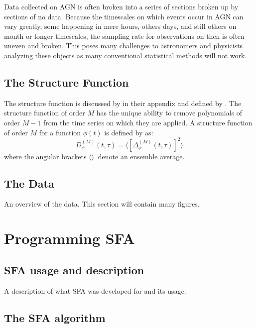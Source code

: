 \documentclass[12pt, oneside]{smuthesis}
\begin{document}
Data collected on AGN is often broken into a series of sections broken up by sections of no data. Because the timescales on which events occur in AGN can vary greatly, some happening in mere hours, others days, and still others on month or longer timescales, the sampling rate for observations on then is often uneven and broken. This poses many challenges to astronomers and physicists analyzing these objects as many conventional statistical methods will not work.

\section{\sc The Structure Function} \label{structureFunction}

The structure function is discussed by \citep{cordes1985} in their appendix and defined by \citep{rutman}. The structure function of order $M$ has the unique ability to remove polynomials of order $M-1$ from the time series on which they are applied. A structure function of order $M$ for a function $\phi\left(t\right)$ is defined by \cite{rutman} as:
\begin{equation}
D^{\left(M\right)}_{\phi}\left(t, \tau\right) = \langle\left[\Delta^{\left(M\right)}_{\phi}\left(t, \tau\right)\right]^{2}\rangle
\end{equation}
where the angular brackets $\langle\rangle\ $ denote an ensemble average.

\citep{collier2001}

\section{\sc The Data} \label{theData}

An overview of the data. This section will contain many figures.

\chapter{\sc Programming SFA} \label{programmingSFA}

\section{\sc SFA usage and description} \label{usageDescription}

A description of what SFA was developed for and its usage.

\section{\sc The SFA algorithm} \label{algorithm}
\end{document}
